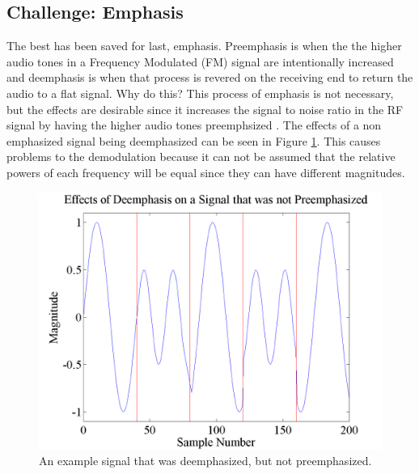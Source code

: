 \subsection{Challenge: Emphasis}
The best has been saved for last, emphasis. Preemphasis is when the the higher audio tones in a Frequency Modulated (FM) signal are intentionally increased and deemphasis is when that process is revered on the receiving end to return the audio to a flat signal. Why do this? This process of emphasis is not necessary, but the effects are desirable since it increases the signal to noise ratio in the RF signal by having the higher audio tones preemphsized \cite{Gibilisco1994}. The effects of a non emphasized signal being deemphasized can be seen in Figure \ref{emphasisExample}. This causes problems to the demodulation because it can not be assumed that the relative powers of each frequency will be equal since they can have different magnitudes. 
\begin{figure}
  \centering
	\includegraphics[width=0.75\linewidth]{images/EffectsofDeemphasisonaSignalthatwasnotpreemphasized.png} 
	\caption{An example signal that was deemphasized, but not preemphasized.}
   \label{emphasisExample}
\end{figure}
